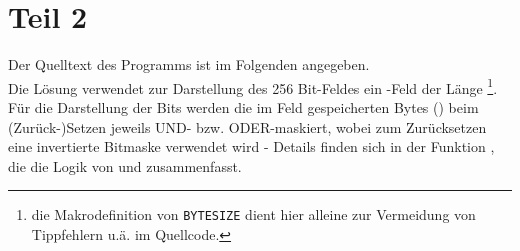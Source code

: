 \section{Teil 2}

Der Quelltext des Programms ist im Folgenden angegeben.\\
Die Lösung verwendet zur Darstellung des 256 Bit-Feldes ein -Feld der Länge \footnote{
die Makrodefinition von \texttt{BYTESIZE} dient hier alleine zur Vermeidung von Tippfehlern u.ä. im Quellcode.
}.\\

\noindent
Für die Darstellung der Bits werden die im Feld gespeicherten Bytes () beim (Zurück-)Setzen jeweils UND- bzw. ODER-maskiert, wobei zum Zurücksetzen eine invertierte Bitmaske verwendet wird - Details finden sich in der Funktion , die die Logik von  und  zusammenfasst.

